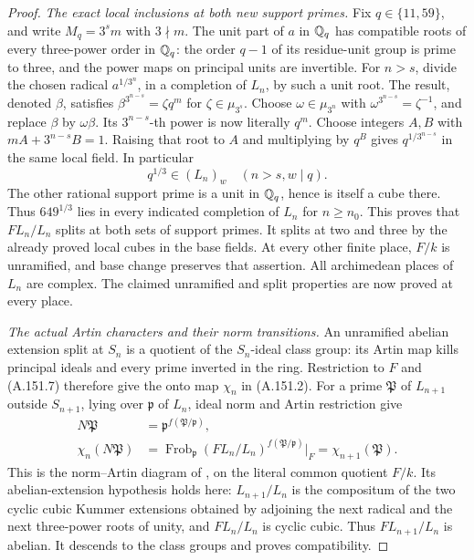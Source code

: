 \begin{proof}
\emph{The exact local inclusions at both new support primes.}
Fix \(q\in\{11,59\}\), and write
\(M_q=3^s m\) with \(3\nmid m\).
The unit part of \(a\) in \(\mathbb Q_q\) has
compatible roots of every three-power
order in \(\mathbb Q_q\): the order \(q-1\)
of its residue-unit group is prime to
three, and the power maps on principal
units are invertible.
For \(n>s\), divide the chosen radical
\(a^{1/3^n}\), in a completion of \(L_n\),
by such a unit root.
The result, denoted \(\beta\), satisfies
\(\beta^{3^{n-s}}=\zeta q^m\) for
\(\zeta\in\mu_{3^s}\).
Choose \(\omega\in\mu_{3^n}\) with
\(\omega^{3^{n-s}}=\zeta^{-1}\), and
replace \(\beta\) by \(\omega\beta\).
Its \(3^{n-s}\)-th power is now literally
\(q^m\).
Choose integers \(A,B\) with
\(mA+3^{n-s}B=1\).
Raising that root to \(A\) and multiplying
by \(q^B\) gives
\(q^{1/3^{n-s}}\) in the same local field.
In particular
\[
                         q^{1/3}\in(L_n)_w
                         \quad(n>s, w\mid q).
\tag{A.151.8}
\]
The other rational support prime is a
unit in \(\mathbb Q_q\), hence is itself a
cube there.  Thus \(649^{1/3}\) lies
in every indicated completion of
\(L_n\) for \(n\geq n_0\).
This proves that \(FL_n/L_n\) splits
at both sets of support primes.
It splits at two and three by the
already proved local cubes in the
base fields.
At every other finite place,
\(F/k\) is unramified, and base
change preserves that assertion.
All archimedean places of \(L_n\)
are complex.
The claimed unramified and split
properties are now proved at every
place.

\emph{The actual Artin characters and their norm transitions.}
An unramified abelian extension split
at \(S_n\) is a quotient of the
\(S_n\)-ideal class group: its Artin
map kills principal ideals and every
prime inverted in the ring.
Restriction to \(F\) and (A.151.7)
therefore give the onto map
\(\chi_n\) in (A.151.2).
For a prime \(\mathfrak P\) of
\(L_{n+1}\) outside \(S_{n+1}\),
lying over \(\mathfrak p\) of
\(L_n\), ideal norm and Artin
restriction give
\[
 \begin{aligned}
 N\mathfrak P
       &=\mathfrak p^{f(\mathfrak P/\mathfrak p)},\\
 \chi_n(N\mathfrak P)
       &=\operatorname{Frob}_{\mathfrak p}(F L_n/L_n)
                         ^{f(\mathfrak P/\mathfrak p)}\big|_F
         =\chi_{n+1}(\mathfrak P).
 \end{aligned}
\tag{A.151.9}
\]
This is the norm--Artin diagram of
\cite[V, Proposition 3.3]{MilneCFT}, on
the literal common quotient \(F/k\).
Its abelian-extension hypothesis holds here:
\(L_{n+1}/L_n\) is the compositum of the
two cyclic cubic Kummer extensions obtained
by adjoining the next radical and the
next three-power roots of unity, and
\(FL_n/L_n\) is cyclic cubic.
Thus \(FL_{n+1}/L_n\) is abelian.
It descends to the class groups and
proves compatibility.


\end{proof}
